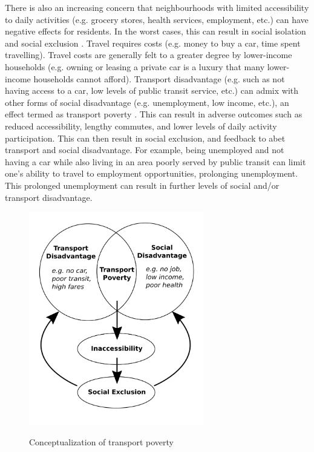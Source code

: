 There is also an increasing concern that neighbourhoods with limited accessibility to daily activities (e.g. grocery stores, health services, employment, etc.) can have negative effects for residents. In the worst cases, this can result in social isolation and social exclusion \cite{ades_are_2012,lucas_transport_2012,lucas_is_2018}. Travel requires costs (e.g. money to buy a car, time spent travelling). Travel costs are generally felt to a greater degree by lower-income households (e.g. owning or leasing a private car is a luxury that many lower-income households cannot afford). Transport disadvantage (e.g. such as not having access to a car, low levels of public transit service, etc.) can admix with other forms of social disadvantage (e.g. unemployment, low income, etc.), an effect termed as transport poverty \cite{lucas_transport_2012, allen_sizing_2019}. This can result in adverse outcomes such as reduced accessibility, lengthy commutes, and lower levels of daily activity participation. This can then result in social exclusion, and feedback to abet transport and social disadvantage. For example, being unemployed and not having a car while also living in an area poorly served by public transit can limit one's ability to travel to employment opportunities, prolonging unemployment. This prolonged unemployment can result in further levels of social and/or transport disadvantage. 

\begin{figure}[h]
	\centering
	\caption{{Conceptualization of transport poverty}}
	\includegraphics[width=3in]{figures/tpov.png}
	\label{tpov}
\end{figure}

